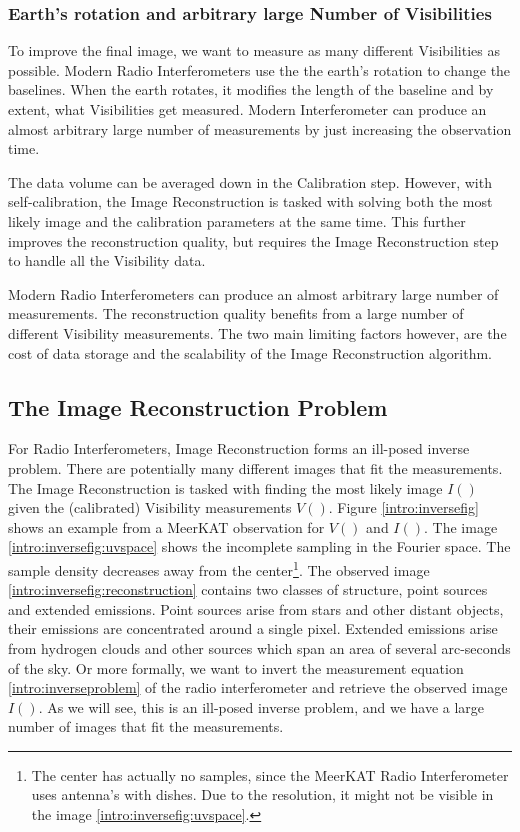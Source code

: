 \subsubsection{Earth's rotation and arbitrary large Number of Visibilities}
To improve the final image, we want to measure as many different Visibilities as possible. Modern Radio Interferometers use the the earth's rotation to change the baselines. When the earth rotates, it modifies the length of the baseline and by extent, what Visibilities get measured. Modern Interferometer can produce an almost arbitrary large number of measurements by just increasing the observation time.

The data volume can be averaged down in the Calibration step. However, with self-calibration, the Image Reconstruction is tasked with solving both the most likely image and the calibration parameters at the same time. This further improves the reconstruction quality\cite{Wiauxselfcal}, but requires the Image Reconstruction step to handle all the Visibility data.

Modern Radio Interferometers can produce an almost arbitrary large number of measurements. The reconstruction quality benefits from a large number of different Visibility measurements. The two main limiting factors however, are the cost of data storage and the scalability of the Image Reconstruction algorithm.


\subsection{The Image Reconstruction Problem}
For Radio Interferometers, Image Reconstruction forms an ill-posed inverse problem. There are potentially many different images that fit the measurements. The Image Reconstruction is tasked with finding the most likely image $I()$ given the (calibrated) Visibility measurements $V()$.  Figure \ref{intro:inversefig} shows an example from a MeerKAT observation for $V()$ and $I()$. The image \ref{intro:inversefig:uvspace} shows the incomplete sampling in the Fourier space. The sample density decreases away from the center\footnote{The center has actually no samples, since the MeerKAT Radio Interferometer uses antenna's with dishes. Due to the resolution, it might not be visible in the image \ref{intro:inversefig:uvspace}.}. The observed image \ref{intro:inversefig:reconstruction} contains two classes of structure, point sources and extended emissions. Point sources arise from stars and other distant objects, their emissions are concentrated around a single pixel. Extended emissions arise from hydrogen clouds and other sources which span an area of several arc-seconds of the sky. Or more formally, we want to invert the measurement equation \eqref{intro:inverseproblem} of the radio interferometer and retrieve the observed image $I()$. As we will see, this is an ill-posed inverse problem, and we have a large number of images that fit the measurements.


